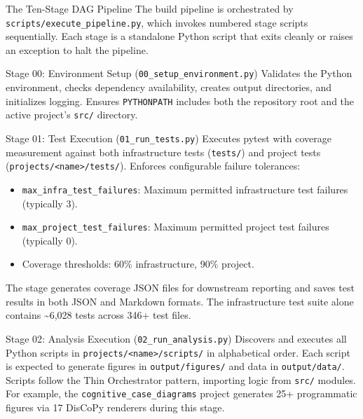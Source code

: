 \documentclass[
  ignorenonframetext,
]{beamer}
\author{\texorpdfstring{}{}}
\date{}
\providecommand{\tightlist}{%
  \setlength{\itemsep}{0pt}\setlength{\parskip}{0pt}}
\begin{document}
\begin{frame}[fragile]{The Ten-Stage DAG Pipeline}
\protect{}\label{the-ten-stage-dag-pipeline}
The build pipeline is orchestrated by
\texttt{scripts/execute\_pipeline.py}, which invokes numbered stage
scripts sequentially. Each stage is a standalone Python script that
exits cleanly or raises an exception to halt the pipeline.

\begin{block}{Stage 00: Environment Setup
(\texttt{00\_setup\_environment.py})}
\protect{}\label{stage-00-environment-setup-00_setup_environment.py}
Validates the Python environment, checks dependency availability,
creates output directories, and initializes logging. Ensures
\texttt{PYTHONPATH} includes both the repository root and the active
project's \texttt{src/} directory.
\end{block}

\begin{block}{Stage 01: Test Execution (\texttt{01\_run\_tests.py})}
\protect{}\label{stage-01-test-execution-01_run_tests.py}
Executes pytest with coverage measurement against both infrastructure
tests (\texttt{tests/}) and project tests
(\texttt{projects/\textless{}name\textgreater{}/tests/}). Enforces
configurable failure tolerances:

\begin{itemize}
\tightlist
\item
  \texttt{max\_infra\_test\_failures}: Maximum permitted infrastructure
  test failures (typically 3).
\item
  \texttt{max\_project\_test\_failures}: Maximum permitted project test
  failures (typically 0).
\item
  Coverage thresholds: 60\% infrastructure, 90\% project.
\end{itemize}

The stage generates coverage JSON files for downstream reporting and
saves test results in both JSON and Markdown formats. The infrastructure
test suite alone contains \textasciitilde6,028 tests across 346+ test
files.
\end{block}

\begin{block}{Stage 02: Analysis Execution
(\texttt{02\_run\_analysis.py})}
\protect{}\label{stage-02-analysis-execution-02_run_analysis.py}
Discovers and executes all Python scripts in
\texttt{projects/\textless{}name\textgreater{}/scripts/} in alphabetical
order. Each script is expected to generate figures in
\texttt{output/figures/} and data in \texttt{output/data/}. Scripts
follow the Thin Orchestrator pattern, importing logic from \texttt{src/}
modules. For example, the \texttt{cognitive\_case\_diagrams} project
generates 25+ programmatic figures via 17 DisCoPy renderers during this
stage.
\end{block}


\end{frame}
\end{document}
